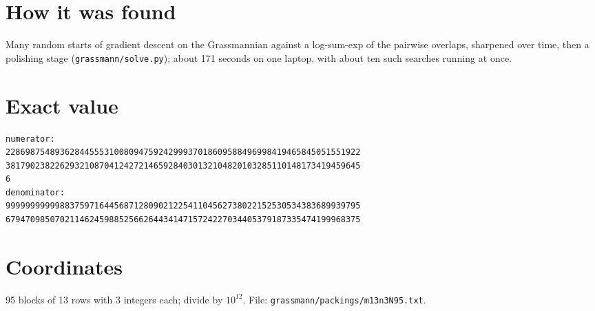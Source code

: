 \documentclass[11pt,a4paper]{article}
\begin{document}
\section{How it was found}
Many random starts of gradient descent on the Grassmannian against a log-sum-exp of the pairwise overlaps, sharpened over time, then a polishing stage (\texttt{grassmann/solve.py}); about 171 seconds on one laptop, with about ten such searches running at once.


\appendix
\section{Exact value}
{\small
\begin{verbatim}
numerator:
228698754893628445553100809475924299937018609588496998419465845051551922
381790238226293210870412427214659284030132104820103285110148173419459645
6
denominator:
999999999998837597164456871280902122541104562738022152530534383689939795
679470985070211462459885256626443414715724227034405379187335474199968375
\end{verbatim}}

\section{Coordinates}
95 blocks of 13 rows with 3 integers each; divide by $10^{12}$. File: \texttt{grassmann/packings/m13n3N95.txt}.
{\tiny
\begin{multicols}{3}
\end{multicols}}
\end{document}
